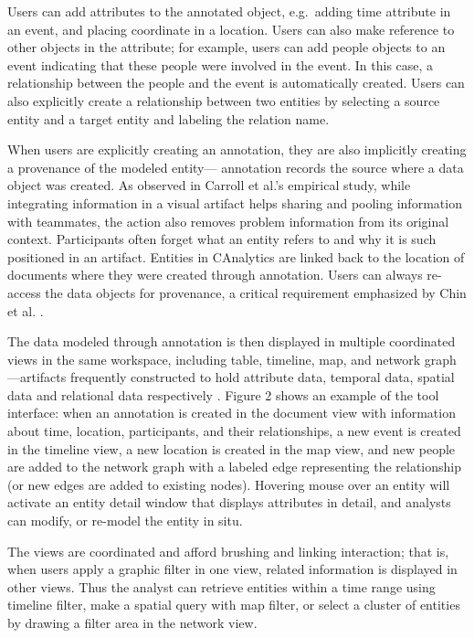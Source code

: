 Users can add attributes to the annotated object, e.g.~adding time
attribute in an event, and placing coordinate in a location. Users can
also make reference to other objects in the attribute; for example,
users can add people objects to an event indicating that these people
were involved in the event. In this case, a relationship between the
people and the event is automatically created. Users can also explicitly
create a relationship between two entities by selecting a source entity
and a target entity and labeling the relation name.

When users are explicitly creating an annotation, they are also
implicitly creating a provenance of the modeled entity--- annotation
records the source where a data object was created. As observed in
Carroll et al.'s \autocite{Carroll2013} empirical study, while
integrating information in a visual artifact helps sharing and pooling
information with teammates, the action also removes problem information
from its original context. Participants often forget what an entity
refers to and why it is such positioned in an artifact. Entities in
CAnalytics are linked back to the location of documents where they were
created through annotation. Users can always re-access the data objects
for provenance, a critical requirement emphasized by Chin et al.
\autocite{Chin2009}.

The data modeled through annotation is then displayed in multiple
coordinated views in the same workspace, including table, timeline, map,
and network graph---artifacts frequently constructed to hold attribute
data, temporal data, spatial data and relational data respectively
\autocite{Carroll2013}. Figure 2 shows an example of the tool interface:
when an annotation is created in the document view with information
about time, location, participants, and their relationships, a new event
is created in the timeline view, a new location is created in the map
view, and new people are added to the network graph with a labeled edge
representing the relationship (or new edges are added to existing
nodes). Hovering mouse over an entity will activate an entity detail
window that displays attributes in detail, and analysts can modify, or
re-model the entity in situ.

The views are coordinated and afford brushing and linking interaction;
that is, when users apply a graphic filter in one view, related
information is displayed in other views. Thus the analyst can retrieve
entities within a time range using timeline filter, make a spatial query
with map filter, or select a cluster of entities by drawing a filter
area in the network view.

